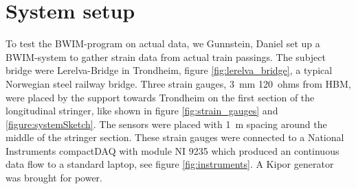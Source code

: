 \section{System setup}
\label{system_setup}
To test the BWIM-program on actual data, we Gunnstein, Daniel set up a BWIM-system to gather strain data from actual train passings. The subject bridge were Lerelva-Bridge in Trondheim, figure \ref{fig:lerelva_bridge}, a typical Norwegian steel railway bridge. Three strain gauges, \SI{3}{\mm} \SI{120}{ohms} from HBM, were placed by the support towards Trondheim on the first section of the longitudinal stringer, like shown in figure \ref{fig:strain_gauges} and \ref{figure:systemSketch}. The sensors were placed with \SI{1}{\m} spacing around the middle of the stringer section. These strain gauges were connected to a National Instruments compactDAQ with module NI 9235 which produced an continuous data flow to a standard laptop, see figure \ref{fig:instruments}. A Kipor generator was brought for power.
